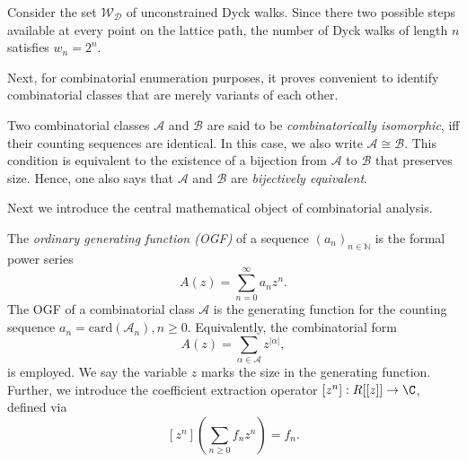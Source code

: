 \begin{example}\label{ex:dyck_walks}
  Consider the set $\mathcal{W}_{\mathcal{D}}$ of unconstrained Dyck walks. Since there two possible steps available at every point on the lattice path, the number of Dyck walks of length $n$ satisfies $w_n = 2^n$.
\end{example}


Next, for combinatorial enumeration purposes, it proves convenient to identify combinatorial classes that are merely variants of each other.

\begin{definition}
  Two combinatorial classes $\mathcal{A}$ and $\mathcal{B}$ are said to be \textit{combinatorically isomorphic}, iff their counting sequences are identical. In this case, we also write $\mathcal{A} \cong \mathcal{B}$. This condition is equivalent to the existence of a bijection from $\mathcal{A}$ to $\mathcal{B}$ that preserves size. Hence, one also says that $\mathcal{A}$ and $\mathcal{B}$ are \textit{bijectively equivalent}.
\end{definition}

Next we introduce the central mathematical object of combinatorial analysis.

\begin{definition}
  The \textit{ordinary generating function (OGF)} of a sequence $(a_n)_{n \in \mathbb{N}}$ is the formal power series
  $$
  A(z) = \sum_{n=0}^\infty a_n z^n.
  $$
  The OGF of a combinatorial class $\mathcal{A}$ is the generating function for the counting sequence $a_n = \mathrm{card}(\mathcal{A}_n), n \geq 0.$ Equivalently, the combinatorial form 
  $$
  A(z) = \sum_{\alpha \in \mathcal{A}} z^{|\alpha|},
  $$
  is employed. We say the variable $z$ marks the size in the generating function.
  Further, we introduce the coefficient extraction operator $[z^n]: R[[z]] \to \C$, defined via
  $$
    [z^n] \left( \sum_{n \geq 0} f_n z^n \right) = f_n.
  $$
\end{definition}

